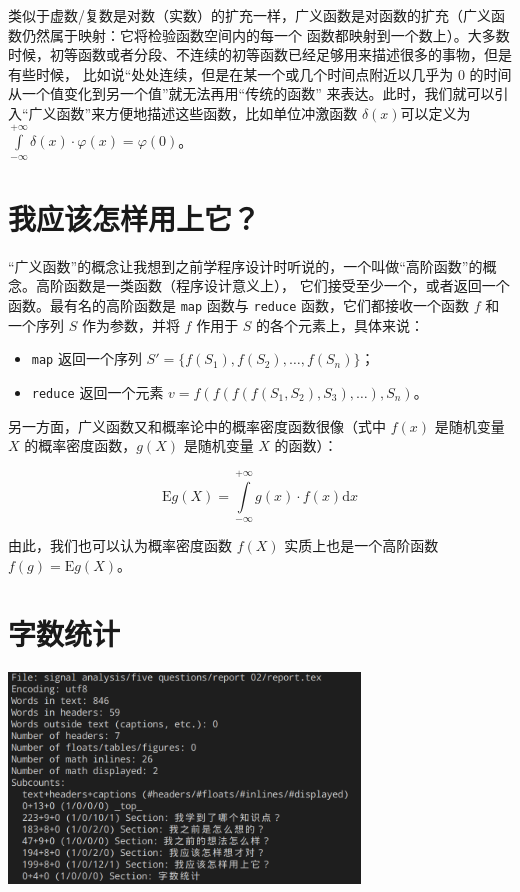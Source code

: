 \documentclass{ctexart}
\begin{document}
    类似于虚数/复数是对数（实数）的扩充一样，广义函数是对函数的扩充（广义函数仍然属于映射：它将检验函数空间内的每一个
    函数都映射到一个数上）。大多数时候，初等函数或者分段、不连续的初等函数已经足够用来描述很多的事物，但是有些时候，
    比如说``处处连续，但是在某一个或几个时间点附近以几乎为 0 的时间从一个值变化到另一个值''就无法再用``传统的函数''
    来表达。此时，我们就可以引入``广义函数''来方便地描述这些函数，比如单位冲激函数 $\delta(x) $可以定义为
    $\int \limits_{-\infty}^{+\infty} \delta(x) \cdot \varphi(x) = \varphi(0)$。

    \section{我应该怎样用上它？}

    ``广义函数''的概念让我想到之前学程序设计时听说的，一个叫做``高阶函数''的概念。高阶函数是一类函数（程序设计意义上），
    它们接受至少一个，或者返回一个函数。最有名的高阶函数是 \verb|map| 函数与 \verb|reduce| 函数，它们都接收一个函数
    $f$ 和一个序列 $S$ 作为参数，并将 $f$ 作用于 $S$ 的各个元素上，具体来说：

    \begin{itemize}
        \item \verb|map| 返回一个序列 $S' = \{f(S_1), f(S_2), \ldots, f(S_n)\}$；
        \item \verb|reduce| 返回一个元素 $v = f(f(f(f(S_1, S_2), S_3), \ldots), S_n)$。
    \end{itemize}

    另一方面，广义函数又和概率论中的概率密度函数很像（式中 $f(x)$ 是随机变量 $X$ 的概率密度函数，$g(X)$ 是随机变量
    $X$ 的函数）：

    \[
        \mathrm{E} g(X) = \int\limits_{-\infty}^{+\infty} g(x)\cdot f(x) \mathrm{d}x
    \]

    由此，我们也可以认为概率密度函数 $f(X)$ 实质上也是一个高阶函数 $f(g) = \mathrm{E} g(X)$。

    \section*{字数统计}

    \begin{center}
        \includegraphics[width=0.7\textwidth]{pics/texcount.png}
    \end{center}
\end{document}
